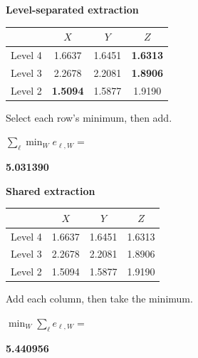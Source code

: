 
\begin{minipage}[t]{.478\linewidth}
\centering
\vspace*{-2.5pt}
{\bfseries\small Level-separated extraction}\par\vspace{7pt}
{\footnotesize\setlength{\tabcolsep}{4pt}\renewcommand{\arraystretch}{1.35}
\begin{tabular}{@{}lccc@{}}
\toprule
 & $X$ & $Y$ & $Z$\\
\midrule
Level 4 & 1.6637 & 1.6451 & \cellcolor{wash}\textbf{1.6313}\\
Level 3 & 2.2678 & 2.2081 & \cellcolor{wash}\textbf{1.8906}\\
Level 2 & \cellcolor{wash}\textbf{1.5094} & 1.5877 & 1.9190\\
\bottomrule
\end{tabular}}\par\vspace{8pt}
{\small Select each row's minimum, then add.}\par\vspace{5pt}
{\color{muted}$\displaystyle\sum_\ell\min_W e_{\ell,W}=$}\par\vspace{3pt}
{\fontsize{17}{20}\selectfont\bfseries\color{muted}5.031390}
\end{minipage}\hfill
\begin{minipage}[t]{.478\linewidth}
\centering
{\bfseries\small\color{accent} Shared extraction}\par\vspace{7pt}
{\footnotesize\setlength{\tabcolsep}{4pt}\renewcommand{\arraystretch}{1.35}
\begin{tabular}{@{}lccc@{}}
\toprule
 & $X$ & $Y$ & $Z$\\
\midrule
Level 4 & 1.6637 & 1.6451 & 1.6313\\
Level 3 & 2.2678 & 2.2081 & 1.8906\\
Level 2 & 1.5094 & 1.5877 & 1.9190\\
\bottomrule
\end{tabular}}\par\vspace{8pt}
{\small Add each column, then take the minimum.}\par\vspace{5pt}
{\color{accent}$\displaystyle\min_W\sum_\ell e_{\ell,W}=$}\par\vspace{3pt}
{\fontsize{17}{20}\selectfont\bfseries\color{accent}5.440956}
\end{minipage}
